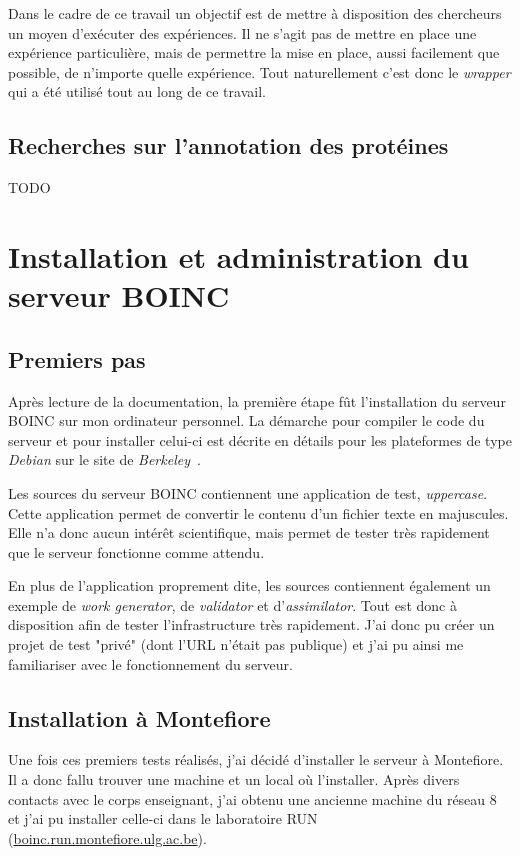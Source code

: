 \documentclass[a4paper, 11pt]{report}
\begin{document}
Dans le cadre de ce travail un objectif est de mettre à disposition des chercheurs un moyen d'exécuter des expériences. Il ne s'agit pas de mettre en place une expérience particulière, mais de permettre la mise en place, aussi facilement que possible, de n'importe quelle expérience. Tout naturellement c'est donc le \textit{wrapper} qui a été utilisé tout au long de ce travail.


\section{Recherches sur l'annotation des protéines}
\label{proteines}
TODO

\chapter{Installation et administration du serveur \textsc{BOINC}}
\section{Premiers pas}
Après lecture de la documentation, la première étape fût l'installation du serveur \textsc{BOINC} sur mon ordinateur personnel. La démarche pour compiler le code du serveur et pour installer celui-ci est décrite en détails pour les plateformes de type \textit{Debian} sur le site de \textit{Berkeley}~\cite{BOINC}.

Les sources du serveur \textsc{BOINC} contiennent une application de test, \textit{uppercase}. Cette application permet de convertir le contenu d'un fichier texte en majuscules. Elle n'a donc aucun intérêt scientifique, mais permet de tester très rapidement que le serveur fonctionne comme attendu.

En plus de l'application proprement dite, les sources contiennent également un exemple de \textit{work generator}, de \textit{validator} et d'\textit{assimilator}. Tout est donc à disposition afin de tester l'infrastructure très rapidement. J'ai donc pu créer un projet de test "privé" (dont l'URL n'était pas publique) et j'ai pu ainsi me familiariser avec le fonctionnement du serveur.

\section{Installation à Montefiore}
Une fois ces premiers tests réalisés, j'ai décidé d'installer le serveur à Montefiore. Il a donc fallu trouver une machine et un local où l'installer. Après divers contacts avec le corps enseignant, j'ai obtenu une ancienne machine du réseau 8 et j'ai pu installer celle-ci dans le laboratoire RUN (\url{boinc.run.montefiore.ulg.ac.be}).
\end{document}
